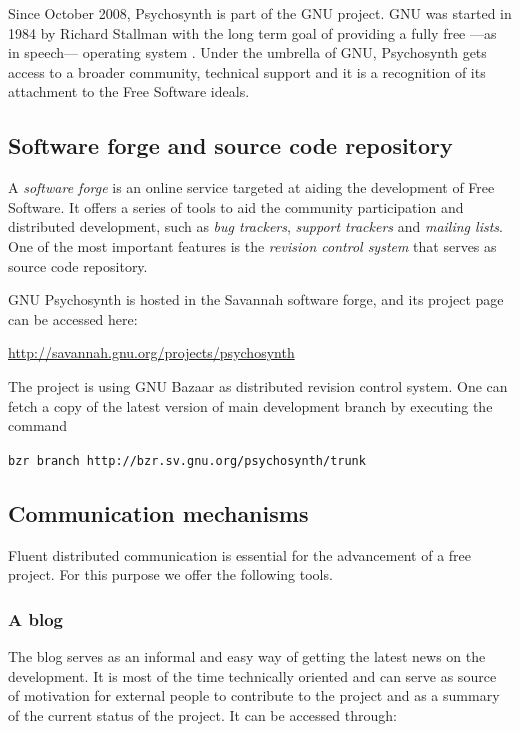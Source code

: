 Since October 2008, Psychosynth is part of the GNU project. GNU was
started in 1984 by Richard Stallman with the long term goal of
providing a fully free ---as in speech--- operating
system \cite{stallman2002free}. Under the umbrella of GNU, Psychosynth
gets access to a broader community, technical support and it is a
recognition of its attachment to the Free Software ideals.

\subsection{Software forge and source code repository}

A \emph{software forge} is an online service targeted at aiding the
development of Free Software. It offers a series of tools to aid the
community participation and distributed development, such as \emph{bug
trackers}, \emph{support trackers} and \emph{mailing lists}. One of
the most important features is the \emph{revision control system} that
serves as source code repository.

GNU Psychosynth is hosted in the Savannah software forge, and its
project page can be accessed here:

\url{http://savannah.gnu.org/projects/psychosynth}

The project is using GNU Bazaar as distributed revision control
system. One can fetch a copy of the latest version of main development
branch by executing the command\:

\verb!bzr branch http://bzr.sv.gnu.org/psychosynth/trunk!

\subsection{Communication mechanisms}

Fluent distributed communication is essential for the advancement of a
free project. For this purpose we offer the following tools.

\subsubsection{A blog}

The blog serves as an informal and easy way of getting the latest news
on the development. It is most of the time technically oriented and
can serve as source of motivation for external people to contribute to the
project and as a summary of the current status of the project. It can
be accessed through: 

